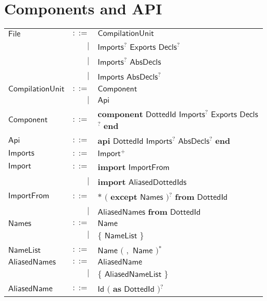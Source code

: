 \section{Components and API} 

 
\begin{longtable}[l]{p{3cm}rl}
$\mathsf{File}$ &  $\mathsf{::=}$  & $\mathsf{CompilationUnit}$ \\
 & $\big|$ &  $\mathsf{Imports}$$^?$ $\mathsf{Exports}$ $\mathsf{Decls}$$^?$ \\
 & $\big|$ &  $\mathsf{Imports}$$^?$ $\mathsf{AbsDecls}$ \\
 & $\big|$ &  $\mathsf{Imports}$ $\mathsf{AbsDecls}$$^?$ \\
$\mathsf{CompilationUnit}$ &  $\mathsf{::=}$  & $\mathsf{Component}$ \\
 & $\big|$ &  $\mathsf{Api}$ \\
$\mathsf{Component}$ &  $\mathsf{::=}$  & $\mathbf{component}$ $\mathsf{DottedId}$ $\mathsf{Imports}$$^?$ $\mathsf{Exports}$ $\mathsf{Decls}$$^?$ $\mathbf{end}$ \\
$\mathsf{Api}$ &  $\mathsf{::=}$  & $\mathbf{api}$ $\mathsf{DottedId}$ $\mathsf{Imports}$$^?$ $\mathsf{AbsDecls}$$^?$ $\mathbf{end}$ \\
$\mathsf{Imports}$ &  $\mathsf{::=}$  & $\mathsf{Import}$$^+$ \\
$\mathsf{Import}$ &  $\mathsf{::=}$  & $\mathbf{import}$ $\mathsf{ImportFrom}$ \\
 & $\big|$ &  $\mathbf{import}$ $\mathsf{AliasedDottedIds}$ \\
$\mathsf{ImportFrom}$ &  $\mathsf{::=}$  & $\mathbf{*}$ $\big($  $\mathbf{except}$ $\mathsf{Names}$ $\big)$$^?$ $\mathbf{from}$ $\mathsf{DottedId}$ \\
 & $\big|$ &  $\mathsf{AliasedNames}$ $\mathbf{from}$ $\mathsf{DottedId}$ \\
$\mathsf{Names}$ &  $\mathsf{::=}$  & $\mathsf{Name}$ \\
 & $\big|$ &  $\mathbf{\{}$ $\mathsf{NameList}$ $\mathbf{\}}$ \\
$\mathsf{NameList}$ &  $\mathsf{::=}$  & $\mathsf{Name}$ $\big($  $\mathbf{,}$ $\mathsf{Name}$ $\big)$$^*$ \\
$\mathsf{AliasedNames}$ &  $\mathsf{::=}$  & $\mathsf{AliasedName}$ \\
 & $\big|$ &  $\mathbf{\{}$ $\mathsf{AliasedNameList}$ $\mathbf{\}}$ \\
$\mathsf{AliasedName}$ &  $\mathsf{::=}$  & $\mathsf{Id}$ $\big($  $\mathbf{as}$ $\mathsf{DottedId}$ $\big)$$^?$ \\

\end{longtable}
